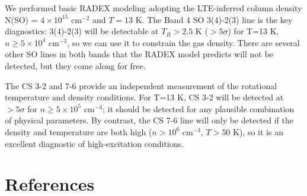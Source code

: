 \documentclass[12pt,a4paper]{article}  %
\newcommand{\percc}{\ensuremath{\mathrm{cm}^{-3}}\xspace}
\newcommand{\persc}{\ensuremath{\mathrm{cm}^{-2}}\xspace}
\begin{document}
We performed basic RADEX modeling adopting the LTE-inferred column density N(SO) = $4\times10^{15}$ \persc and $T=13$ K.
The Band 4 SO 3(4)-2(3) line is the key diagnostics: 3(4)-2(3) will be detectable at $T_B>2.5$ K ($>5\sigma$) for T=13 K, $n\geq5\times10^4$ \percc, so we can use it to constrain the gas density.
There are several other SO lines in both bands that the RADEX model predicts will not be detected, but they come along for free.

The CS 3-2 and 7-6 provide an independent measurement of the rotational temperature and density conditions.
For T=13 K, CS 3-2 will be detected at $>5\sigma$ for $n\geq5\times10^5$ \percc; it should be detected for any plausible combination of physical parameters.
By contrast, the CS 7-6 line will only be detected if the density and temperature are both high ($n>10^6$ \percc, $T>50$ K), so it is an excellent diagnostic of high-excitation conditions.
% 

\section{References}


{}



\end{document}

